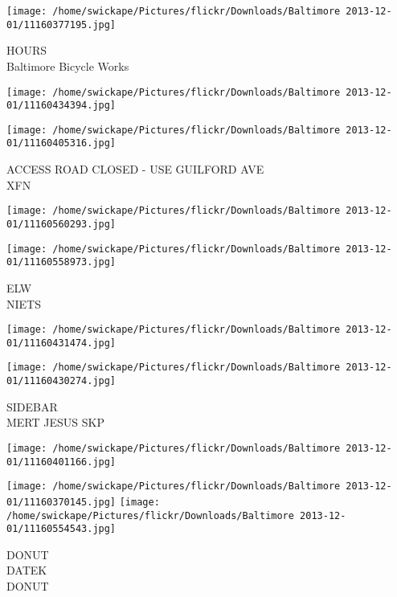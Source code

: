 \documentclass[10pt,letterpaper]{article}
\begin{document}
\vspace{0.25in}
\texttt{[image: /home/swickape/Pictures/flickr/Downloads/Baltimore 2013-12-01/11160377195.jpg]}

HOURS\\
Baltimore Bicycle Works\\
\pagebreak

\texttt{[image: /home/swickape/Pictures/flickr/Downloads/Baltimore 2013-12-01/11160434394.jpg]}

\vspace{0.25in}
\texttt{[image: /home/swickape/Pictures/flickr/Downloads/Baltimore 2013-12-01/11160405316.jpg]}

ACCESS ROAD CLOSED {-} USE GUILFORD AVE\\
XFN\\
\pagebreak

\texttt{[image: /home/swickape/Pictures/flickr/Downloads/Baltimore 2013-12-01/11160560293.jpg]}

\vspace{0.25in}
\texttt{[image: /home/swickape/Pictures/flickr/Downloads/Baltimore 2013-12-01/11160558973.jpg]}

ELW\\
NIETS\\
\pagebreak

\texttt{[image: /home/swickape/Pictures/flickr/Downloads/Baltimore 2013-12-01/11160431474.jpg]}

\vspace{0.25in}
\texttt{[image: /home/swickape/Pictures/flickr/Downloads/Baltimore 2013-12-01/11160430274.jpg]}

SIDEBAR\\
MERT JESUS SKP\\
\pagebreak

\texttt{[image: /home/swickape/Pictures/flickr/Downloads/Baltimore 2013-12-01/11160401166.jpg]}

\vspace{0.25in}
\texttt{[image: /home/swickape/Pictures/flickr/Downloads/Baltimore 2013-12-01/11160370145.jpg]}
\texttt{[image: /home/swickape/Pictures/flickr/Downloads/Baltimore 2013-12-01/11160554543.jpg]}

DONUT\\
DATEK\\
DONUT\\
\pagebreak
\end{document}
